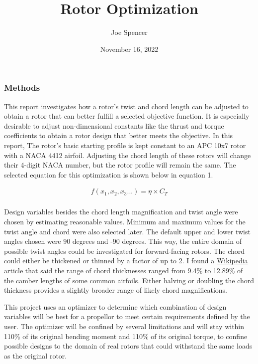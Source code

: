 \documentclass{article}
\begin{document}
\author{Joe Spencer}
\title{Rotor Optimization}
\date{November 16, 2022}
\maketitle

\subsubsection*{Methods}

This report investigates how a rotor's twist and chord length can be adjusted to obtain a rotor that can better fulfill a selected objective function. It is especially desirable to adjust non-dimensional constants like the thrust and torque coefficients to obtain a rotor design that better meets the objective. In this report, The rotor's basic starting profile is kept constant to an APC 10x7 rotor with a NACA 4412 airfoil. Adjusting the chord length of these rotors will change their 4-digit NACA number, but the rotor profile will remain the same. The selected equation for this optimization is shown below in equation 1. \newline

\begin{equation}
\begin{aligned}
	f(x_{1}, x_{2}, x_{3}...) = \eta \times C_{T} \\
\end{aligned}
\end{equation} \newline

\noindent Design variables besides the chord length magnification and twist angle were chosen by estimating reasonable values. Minimum and maximum values for the twist angle and chord were also selected later. The default upper and lower twist angles chosen were 90 degrees and -90 degrees. This way, the entire domain of possible twist angles could be investigated for forward-facing rotors. The chord could either be thickened or thinned by a factor of up to 2. I found a \href{https://en.wikipedia.org/wiki/Thickness-to-chord_ratio}{Wikipedia article} that said the range of chord thicknesses ranged from 9.4\% to 12.89\% of the camber lengths of some common airfoils. Either halving or doubling the chord thickness provides a slightly broader range of likely chord magnifications. \newline

\noindent This project uses an optimizer to determine which combination of design variables will be best for a propellor to meet certain requirements defined by the user. The optimizer will be confined by several limitations and will stay within 110\% of its original bending moment and 110\% of its original torque, to confine possible designs to the domain of real rotors that could withstand the same loads as the original rotor. \newline
\end{document}
